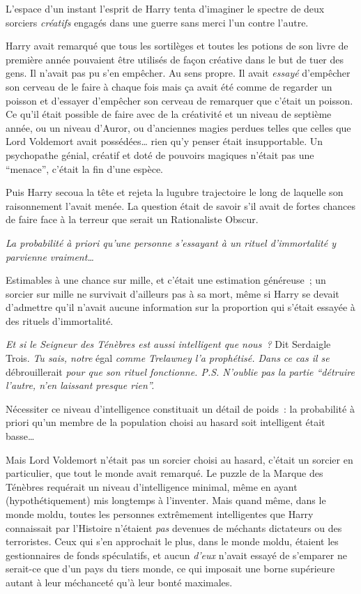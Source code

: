 L'espace d'un instant l'esprit de Harry tenta d'imaginer le spectre de deux sorciers \emph{créatifs} engagés dans une guerre sans merci l'un contre l'autre.

Harry avait remarqué que tous les sortilèges et toutes les potions de son livre de première année pouvaient être utilisés de façon créative dans le but de tuer des gens. Il n'avait pas pu s'en empêcher. Au sens propre. Il avait \emph{essayé} d'empêcher son cerveau de le faire à chaque fois mais ça avait été comme de regarder un poisson et d'essayer d'empêcher son cerveau de remarquer que c'était un poisson. Ce qu'il était possible de faire avec de la créativité et un niveau de septième année, ou un niveau d'Auror, ou d'anciennes magies perdues telles que celles que Lord Voldemort avait possédées… rien qu'y penser était insupportable. Un psychopathe génial, créatif et doté de pouvoirs magiques n'était pas une “menace”, c'était la fin d'une espèce.

Puis Harry secoua la tête et rejeta la lugubre trajectoire le long de laquelle son raisonnement l'avait menée. La question était de savoir s'il avait de fortes chances de faire face à la terreur que serait un Rationaliste Obscur.

\emph{La probabilité à priori qu'une personne s'essayant à un rituel d'immortalité y parvienne vraiment…}

Estimables à une chance sur mille, et c'était une estimation généreuse~; un sorcier sur mille ne survivait d'ailleurs pas à sa mort, même si Harry se devait d'admettre qu'il n'avait aucune information sur la proportion qui s'était essayée à des rituels d'immortalité.

\emph{Et si le Seigneur des Ténèbres est aussi intelligent que nous~?} Dit Serdaigle Trois. \emph{Tu sais, notre} égal \emph{comme Trelawney l'a prophétisé. Dans ce cas il se} débrouillerait \emph{pour que son rituel fonctionne. P.S. N'oublie pas la partie “détruire l'autre, n'en laissant presque rien”.}

Nécessiter ce niveau d'intelligence constituait un détail de poids~: la probabilité à priori qu'un membre de la population choisi au hasard soit intelligent était basse…

Mais Lord Voldemort n'était pas un sorcier choisi au hasard, c'était un sorcier en particulier, que tout le monde avait remarqué. Le puzzle de la Marque des Ténèbres requérait un niveau d'intelligence minimal, même en ayant (hypothétiquement) mis longtemps à l'inventer. Mais quand même, dans le monde moldu, toutes les personnes extrêmement intelligentes que Harry connaissait par l'Histoire n'étaient \emph{pas} devenues de méchants dictateurs ou des terroristes. Ceux qui s'en approchait le plus, dans le monde moldu, étaient les gestionnaires de fonds spéculatifs, et aucun \emph{d'eux} n'avait essayé de s'emparer ne serait-ce que d'un pays du tiers monde, ce qui imposait une borne supérieure autant à leur méchanceté qu'à leur bonté maximales.

